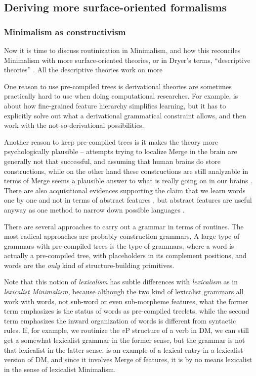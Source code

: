 \documentclass[../main.tex]{subfiles}
\begin{document}
\subsection{Deriving more surface-oriented formalisms}

\subsubsection{Minimalism as constructivism}\label{sec:routine}

Now it is time to discuss routinization in Minimalism, and how this reconciles Minimalism with more 
surface-oriented theories, or in Dryer's terms, ``descriptive theories'' \citep{dryer2006descriptive}.
All the descriptive theories work on more %

One reason to use pre-compiled trees is derivational theories are sometimes 
practically hard to use when doing computational researches. For example, \citet{liter2020modeling}
is about how fine-grained feature hierarchy simplifies learning, but it has to explicitly solve out what 
a derivational grammatical constraint allows, and then work with the not-so-derivational possibilities.

Another reason to keep pre-compiled trees is it makes the theory more psychologically plausible --
attempts trying to localize Merge in the brain are generally not that successful, and assuming that 
human brains do store constructions, while on the other hand these constructions are still analyzable 
in terms of Merge seems a plausible answer to what is really going on in our brains
\citep{brain-syntax-1,brain-syntax-2}. There are also acquisitional evidences supporting the claim 
that we learn words one by one and not in terms of abstract features \citep{white2022lexicalization},
but abstract features are useful anyway as one method to narrow down possible languages \citep{liter2020modeling}.

There are several approaches to carry out a grammar in terms of routines. The most radical approaches
are probably construction grammars, %
A large type of grammars with pre-compiled trees is the type of  grammars, where 
a word is actually a pre-compiled tree, with placeholders in its complement positions, and words 
are the \emph{only} kind of structure-building primitives. %

Note that this notion of 
\emph{lexicalism} has subtle differences with \emph{lexicalism} as in \emph{lexicalist Minimalism}, 
because although the two kind of lexicalist grammars all work with words, not sub-word or even 
sub-morpheme features, what the former term emphasizes is the status of words as pre-compiled
treelets, while the second term emphasizes the inward organization of words is different from 
syntactic rules. If, for example, we routinize the $v$P structure of a verb in DM, we can still get a somewhat 
lexicalist grammar in the former sense, but the grammar is not that lexicalist in the latter sense.
 is an example of a lexical entry in a lexicalist version of DM, 
and since it involves Merge of features, it is by no means lexicalist in the sense of lexicalist Minimalism.
\end{document}
